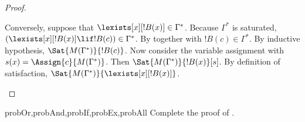 \documentclass[../../../include/open-logic-section]{subfiles}
\begin{document}
\begin{proof}
\begin{enumerate}
{{{    Conversely, suppose that $\lexists[x][!B(x)] \in
    \Gamma^*$. Because $\Gamma^*$ is saturated, $(\lexists[x][!B(x)]
    \lif !B(c)) \in \Gamma^*$. By
    together with
    $!B(c) \in \Gamma^*$. By inductive hypothesis,
    $\Sat{M(\Gamma^*)}{!B(c)}$. Now consider the variable assignment
    with $s(x) = \Assign{c}{M(\Gamma^*)}$. Then
    $\Sat{M(\Gamma^*)}{!B(x)}[s]$. By definition of satisfaction,
    $\Sat{M(\Gamma^*)}{\lexists[x][!B(x)]}$.}}}{}
\end{enumerate}
\end{proof}

\begin{probtag}{probOr,probAnd,probIf,probEx,probAll}
Complete the proof of .
\end{probtag}
\end{document}

